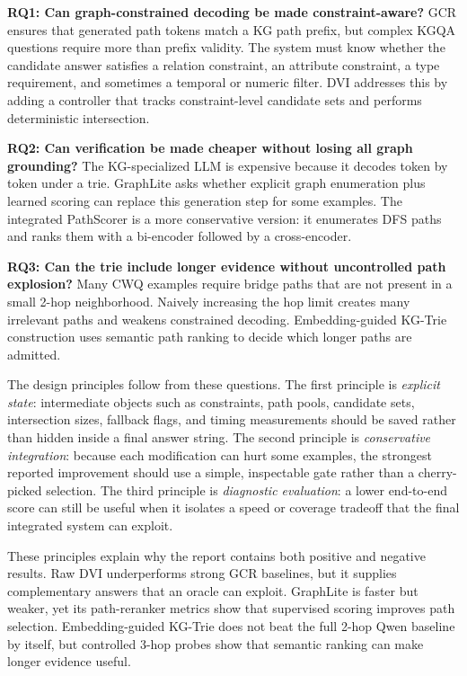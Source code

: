 \documentclass[10pt,twocolumn]{article}
\begin{document}
\textbf{RQ1: Can graph-constrained decoding be made constraint-aware?} GCR ensures that generated path tokens match a KG path prefix, but complex KGQA questions require more than prefix validity. The system must know whether the candidate answer satisfies a relation constraint, an attribute constraint, a type requirement, and sometimes a temporal or numeric filter. DVI addresses this by adding a controller that tracks constraint-level candidate sets and performs deterministic intersection.

\textbf{RQ2: Can verification be made cheaper without losing all graph grounding?} The KG-specialized LLM is expensive because it decodes token by token under a trie. GraphLite asks whether explicit graph enumeration plus learned scoring can replace this generation step for some examples. The integrated PathScorer is a more conservative version: it enumerates DFS paths and ranks them with a bi-encoder followed by a cross-encoder.

\textbf{RQ3: Can the trie include longer evidence without uncontrolled path explosion?} Many CWQ examples require bridge paths that are not present in a small 2-hop neighborhood. Naively increasing the hop limit creates many irrelevant paths and weakens constrained decoding. Embedding-guided KG-Trie construction uses semantic path ranking to decide which longer paths are admitted.

The design principles follow from these questions. The first principle is \emph{explicit state}: intermediate objects such as constraints, path pools, candidate sets, intersection sizes, fallback flags, and timing measurements should be saved rather than hidden inside a final answer string. The second principle is \emph{conservative integration}: because each modification can hurt some examples, the strongest reported improvement should use a simple, inspectable gate rather than a cherry-picked selection. The third principle is \emph{diagnostic evaluation}: a lower end-to-end score can still be useful when it isolates a speed or coverage tradeoff that the final integrated system can exploit.

These principles explain why the report contains both positive and negative results. Raw DVI underperforms strong GCR baselines, but it supplies complementary answers that an oracle can exploit. GraphLite is faster but weaker, yet its path-reranker metrics show that supervised scoring improves path selection. Embedding-guided KG-Trie does not beat the full 2-hop Qwen baseline by itself, but controlled 3-hop probes show that semantic ranking can make longer evidence useful.
\end{document}
